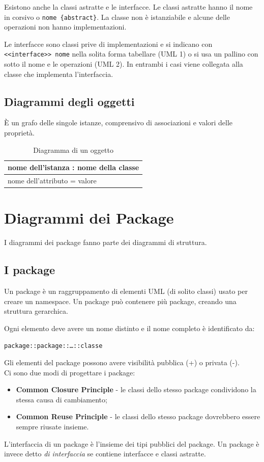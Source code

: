 Esistono anche la classi astratte e le interfacce. Le classi astratte hanno il nome in corsivo o \texttt{nome \{abstract\}}. La classe non è istanziabile e alcune delle operazioni non hanno implementazioni. 

Le interfacce sono classi prive di implementazioni e si indicano con \texttt{<<interface>> nome} nella solita forma tabellare (UML 1) o si usa un pallino con sotto il nome e le operazioni (UML 2). 
In entrambi i casi viene collegata alla classe che implementa l'interfaccia.

\subsection{Diagrammi degli oggetti}
\`E un grafo delle singole istanze, comprensivo di associazioni e valori delle proprietà.

\begin{table}[H]
\centering
\begin{tabular}{|l|}
\hline
nome dell'istanza : nome della classe \\
\hline
nome dell'attributo = valore \\
\hline
\end{tabular}
\caption{Diagramma di un oggetto}
\end{table}

\section{Diagrammi dei Package}
I diagrammi dei package fanno parte dei diagrammi di struttura. 

\subsection{I package}
Un package è un raggruppamento di elementi UML (di solito classi) usato per creare un namespace.
Un package può contenere più package, creando una struttura gerarchica.

Ogni elemento deve avere un nome distinto e il nome completo è identificato da:
\begin{verbatim}
package::package::…::classe
\end{verbatim}
Gli elementi del package possono avere visibilità pubblica (+) o privata (-). \\
Ci sono due modi di progettare i package:
\begin{itemize}
\item \textbf{Common Closure Principle} - le classi dello stesso package condividono la stessa causa di cambiamento;
\item \textbf{Common Reuse Principle} - le classi dello stesso package dovrebbero essere sempre riusate insieme.
\end{itemize}
L'interfaccia di un package è l'insieme dei tipi pubblici del package.
Un package è invece detto \textit{di interfaccia} se contiene interfacce e classi astratte. 


